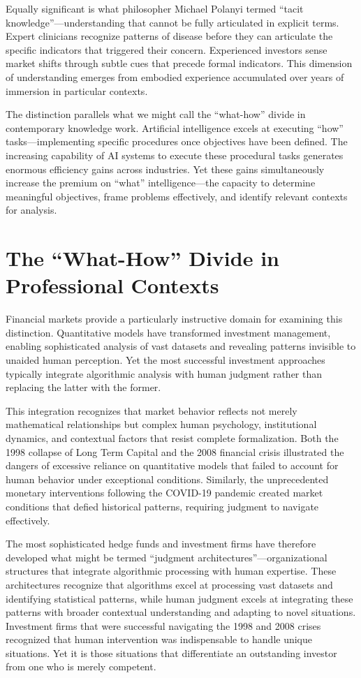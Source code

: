 \documentclass[
  Letterpaper,
]{scrbook}
\begin{document}
Equally significant is what philosopher Michael Polanyi termed ``tacit
knowledge''---understanding that cannot be fully articulated in explicit
terms. Expert clinicians recognize patterns of disease before they can
articulate the specific indicators that triggered their concern.
Experienced investors sense market shifts through subtle cues that
precede formal indicators. This dimension of understanding emerges from
embodied experience accumulated over years of immersion in particular
contexts.

The distinction parallels what we might call the ``what-how'' divide in
contemporary knowledge work. Artificial intelligence excels at executing
``how'' tasks---implementing specific procedures once objectives have
been defined. The increasing capability of AI systems to execute these
procedural tasks generates enormous efficiency gains across industries.
Yet these gains simultaneously increase the premium on ``what''
intelligence---the capacity to determine meaningful objectives, frame
problems effectively, and identify relevant contexts for analysis.

\section{The ``What-How'' Divide in Professional
Contexts}\label{the-what-how-divide-in-professional-contexts}

Financial markets provide a particularly instructive domain for
examining this distinction. Quantitative models have transformed
investment management, enabling sophisticated analysis of vast datasets
and revealing patterns invisible to unaided human perception. Yet the
most successful investment approaches typically integrate algorithmic
analysis with human judgment rather than replacing the latter with the
former.

This integration recognizes that market behavior reflects not merely
mathematical relationships but complex human psychology, institutional
dynamics, and contextual factors that resist complete formalization.
Both the 1998 collapse of Long Term Capital and the 2008 financial
crisis illustrated the dangers of excessive reliance on quantitative
models that failed to account for human behavior under exceptional
conditions. Similarly, the unprecedented monetary interventions
following the COVID-19 pandemic created market conditions that defied
historical patterns, requiring judgment to navigate effectively.

The most sophisticated hedge funds and investment firms have therefore
developed what might be termed ``judgment
architectures''---organizational structures that integrate algorithmic
processing with human expertise. These architectures recognize that
algorithms excel at processing vast datasets and identifying statistical
patterns, while human judgment excels at integrating these patterns with
broader contextual understanding and adapting to novel situations.
Investment firms that were successful navigating the 1998 and 2008
crises recognized that human intervention was indispensable to handle
unique situations. Yet it is those situations that differentiate an
outstanding investor from one who is merely competent.
\end{document}
